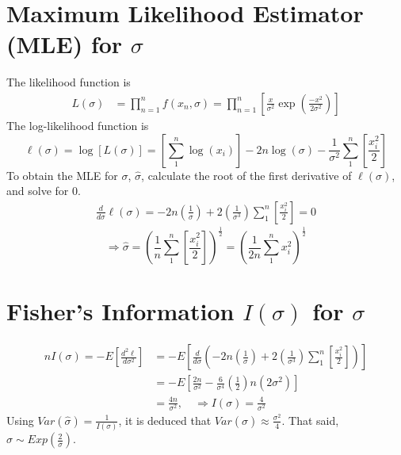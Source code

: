 \documentclass[11pt]{article}
\begin{document}
\section{Maximum Likelihood Estimator (MLE) for $\sigma$}
The likelihood function is
\begin{equation}
    \begin{split}
        L(\sigma) &= \prod_{n=1}^{n}f(x_{n},\sigma) = \prod_{n=1}^{n}\left[\frac{x}{\sigma^{2}}\exp\left(\frac{-x^{2}}{2\sigma^{2}}\right)\right]
    \end{split}
\end{equation}
The log-likelihood function is
\begin{equation}
    \ell(\sigma) = \log[L(\sigma)] = \left[\sum_{1}^{n}\log(x_{i})\right] -2n\log(\sigma) - \frac{1}{\sigma^{2}}\sum_{1}^{n}\left[\frac{x_{i}^{2}}{2}\right]
\end{equation}
To obtain the MLE for $\sigma$, $\hat{\sigma}$, calculate the root of the first derivative of $\ell(\sigma)$, and solve for 0.
\begin{equation}
    \begin{split}
        \frac{d}{d\sigma}\ell(\sigma) = -2n\left(\frac{1}{\sigma}\right)+2\left(\frac{1}{\sigma^{3}}\right)\sum_{1}^{n}\left[\frac{x_{i}^{2}}{2}\right] = 0
    \end{split}
\end{equation}
\begin{equation}
    \Longrightarrow \hat{\sigma} =
    \left(\frac{1}{n}\sum_{1}^{n}\left[\frac{x_{i}^{2}}{2}\right]\right)^{\frac{1}{2}}
    = \left(\frac{1}{2n}\sum_{1}^{n}x_{i}^{2}\right)^{\frac{1}{2}}
    \label{eq:mle}
\end{equation}
\section{Fisher's Information $I(\sigma)$ for $\sigma$}
\begin{equation}
    \begin{split}
        nI(\sigma) = -E\left[\frac{d^{2}\ell}{d\sigma^{2}}\right] &= -E\left[\frac{d}{d\sigma}\left(-2n\left(\frac{1}{\sigma}\right)+2\left(\frac{1}{\sigma^{3}}\right)\sum_{1}^{n}\left[\frac{x_{i}^{2}}{2}\right]\right)\right]\\
        &= -E\left[\frac{2n}{\sigma^{2}}-\frac{6}{\sigma^{4}}\left(\frac{1}{2}\right)n(2\sigma^{2})\right]\\
        &=\frac{4n}{\sigma^{2}}, \quad \Longrightarrow I(\sigma) = \frac{4}{\sigma^{2}}
    \end{split}
    \label{eq:fishers}
\end{equation}
Using $Var(\hat{\sigma}) = \frac{1}{I(\sigma)}$, it is deduced that $Var(\hat{\sigma}) \approx \frac{\sigma^{2}}{4}$. That said, $\hat{\sigma}\sim Exp(\frac{2}{\sigma})$.
\end{document}
